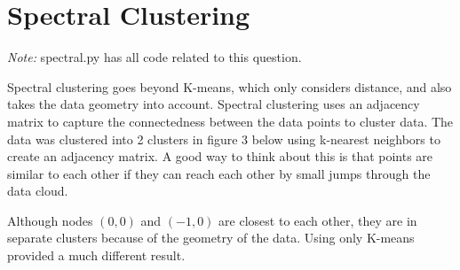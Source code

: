 \documentclass[a4paper]{article}
\begin{document}
\section{Spectral Clustering}
\textit{Note:} spectral.py has all code related to this question.

Spectral clustering goes beyond K-means, which only considers distance, and also takes the data geometry into account.  Spectral clustering uses an adjacency matrix to capture the connectedness between the data points to cluster data.  The data was clustered into 2 clusters in figure 3 below using k-nearest neighbors to create an adjacency matrix. A good way to think about this is that points are similar to each other if they can reach each other by small jumps through the data cloud.

Although nodes $(0, 0)$ and $(-1, 0)$ are closest to each other, they are in separate clusters because of the geometry of the data.  Using only K-means provided a much different result.
\end{document}

